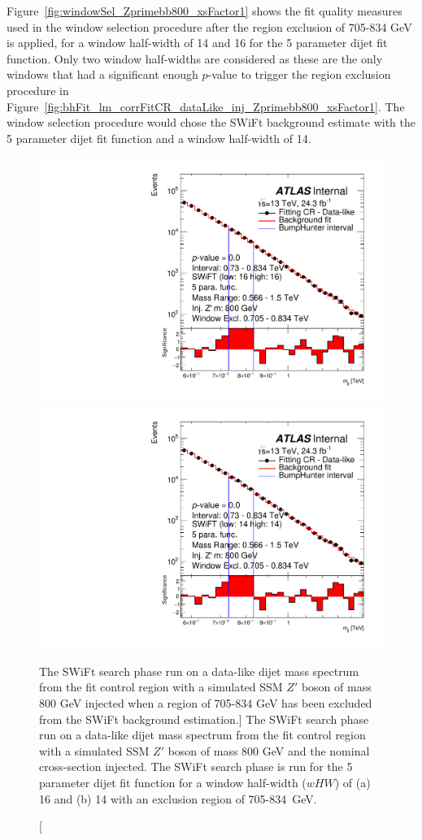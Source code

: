 Figure~\ref{fig:windowSel_Zprimebb800_xsFactor1} shows the fit quality measures used in the window selection procedure after the region exclusion of 705-834 GeV is applied,
for a window half-width of 14 and 16 for the 5 parameter dijet fit function.
Only two window half-widths are considered as these are the only windows that had a significant enough $p$-value to trigger the region exclusion procedure in
Figure~\ref{fig:bhFit_lm_corrFitCR_dataLike_inj_Zprimebb800_xsFactor1}.
The window selection procedure would chose the SWiFt background estimate with the 5 parameter dijet fit function and a window half-width of 14.


\begin{figure}[!tb]
\captionsetup[subfigure]{aboveskip=0pt,justification=centering}
\centering
{} {
  \includegraphics[width=0.45\linewidth, angle=0]{figs/Dibjet/LowMass/FitStudy_min566/bhFit_corrFitCR_dataLike_5para_low16_high16_inj_Zprimebb800_xsFactor1_removedWindow.pdf}
}
 {
  \includegraphics[width=0.45\linewidth, angle=0]{figs/Dibjet/LowMass/FitStudy_min566/bhFit_corrFitCR_dataLike_5para_low14_high14_inj_Zprimebb800_xsFactor1_removedWindow.pdf}
}

\caption
    [The SWiFt search phase run on a data-like dijet mass spectrum
      from the fit control region with a simulated SSM $Z'$ boson of mass 800 GeV injected when a region of 705-834 GeV has been excluded from the SWiFt background estimation.]
    {\label{fig:bhFit_lm_corrFitCR_dataLike_inj_Zprimebb800_xsFactor1_removedWindow}
      The SWiFt search phase run on a data-like dijet mass spectrum
      from the fit control region with a simulated SSM $Z'$ boson of mass 800 GeV and the nominal cross-section injected.
      The SWiFt search phase is run for the 5 parameter dijet fit function for a window half-width ($wHW$) of (a) 16 and (b) 14
      with an exclusion region of 705-834~GeV.}
\end{figure}

